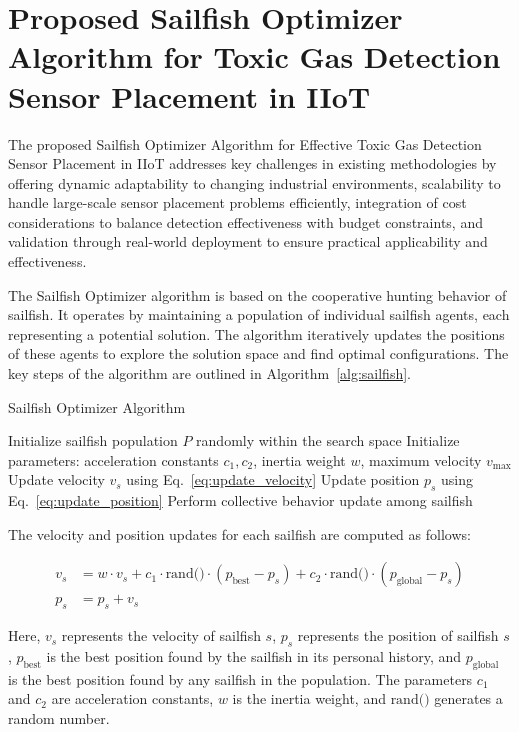 \documentclass[conference]{IEEEtran}
\begin{document}
\section{Proposed Sailfish Optimizer Algorithm for Toxic Gas Detection Sensor Placement in IIoT}\label{sec3}
The proposed Sailfish Optimizer Algorithm for Effective Toxic Gas Detection Sensor Placement in IIoT addresses key challenges in existing methodologies by offering dynamic adaptability to changing industrial environments, scalability to handle large-scale sensor placement problems efficiently, integration of cost considerations to balance detection effectiveness with budget constraints, and validation through real-world deployment to ensure practical applicability and effectiveness.

The Sailfish Optimizer algorithm is based on the cooperative hunting behavior of sailfish. It operates by maintaining a population of individual sailfish agents, each representing a potential solution. The algorithm iteratively updates the positions of these agents to explore the solution space and find optimal configurations. The key steps of the algorithm are outlined in Algorithm~\ref{alg:sailfish}.

\begin{algorithm}
\caption{Sailfish Optimizer Algorithm}
\label{alg:sailfish}
\begin{algorithmic}[1]
\STATE Initialize sailfish population $P$ randomly within the search space
\STATE Initialize parameters: acceleration constants $c_1, c_2$, inertia weight $w$, maximum velocity $v_{\text{max}}$
        \STATE Update velocity $v_s$ using Eq.~\eqref{eq:update_velocity}
        \STATE Update position $p_s$ using Eq.~\eqref{eq:update_position}
    \ENDFOR
    \STATE Perform collective behavior update among sailfish
\ENDWHILE
\end{algorithmic}
\end{algorithm}

The velocity and position updates for each sailfish are computed as follows:

\begin{align}
    v_s &= w \cdot v_s + c_1 \cdot \text{rand()} \cdot (p_{\text{best}} - p_s) + c_2 \cdot \text{rand()} \cdot (p_{\text{global}} - p_s) \label{eq:update_velocity} \\
    p_s &= p_s + v_s \label{eq:update_position}
\end{align}

Here, $v_s$ represents the velocity of sailfish $s$, $p_s$ represents the position of sailfish $s$, $p_{\text{best}}$ is the best position found by the sailfish in its personal history, and $p_{\text{global}}$ is the best position found by any sailfish in the population. The parameters $c_1$ and $c_2$ are acceleration constants, $w$ is the inertia weight, and $\text{rand()}$ generates a random number.
\end{document}
